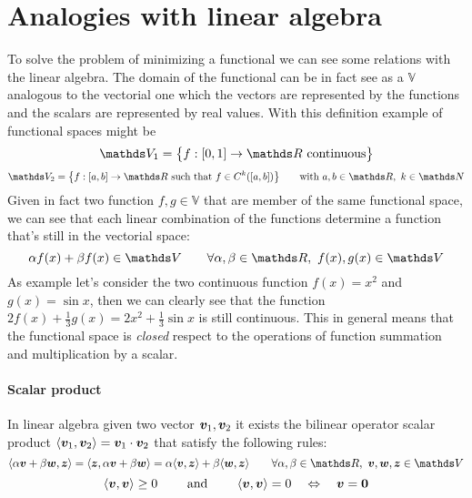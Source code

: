 \section{Analogies with linear algebra}
To solve the problem of minimizing a functional we can see some relations with the linear algebra. The domain of the functional can be in fact see as a  $\mathds V$ analogous to the vectorial one which the vectors are represented by the functions and the scalars are represented by real values. With this definition example of functional spaces might be
\[ \mathds V_1 = \big\{ f : [0,1] \rightarrow \R \textrm{ continuous}\big\} \]
\[ \mathds V_2 = \big\{ f: [a,b]\rightarrow \R \textrm{ such that } f\in C^k([a,b]) \big\} \qquad \textrm{with } a,b \in \R, \ k\in \mathds N \]
Given in fact two function $f,g \in \mathds V$ that are member of the same functional space, we can see that each linear combination of the functions determine a function that's still in the vectorial space:
\[ \alpha f(x) + \beta f(x) \in \mathds V \qquad \forall \alpha,\beta \in \R, \ f(x),g(x) \in \mathds V \]
As example let's consider the two continuous function $f(x) = x^2$ and $g(x) = \sin x$, then we can clearly see that the function $2f(x) + \frac 13 g(x) = 2x^2 +\frac 13\sin x$ is still continuous. This in general means that the functional space is \textit{closed} respect to the operations of function summation and multiplication by a scalar.

\paragraph{Scalar product} In linear algebra given two vector $\boldsymbol{v}_1, \boldsymbol{v}_2$ it exists the bilinear operator scalar product $\langle \boldsymbol{v}_1,\boldsymbol{v}_2 \rangle = \boldsymbol{v}_1 \cdot \boldsymbol{v}_2$  that satisfy the following rules:
\[ \langle \alpha \vett v + \beta \vett w, \vett z\rangle = \langle \vett z , \alpha \vett v + \beta \vett w\rangle = \alpha \langle \vett v,\vett z\rangle + \beta \langle \vett w,\vett z\rangle \qquad \forall \alpha,\beta \in \R, \ \vett v,\vett w,\vett z \in \mathds V \]	
\[ \langle \boldsymbol{v},\boldsymbol{v}\rangle \geq 0 \qquad \textrm{ and } \qquad \langle \boldsymbol{v},\boldsymbol{v} \rangle = 0 \quad \Leftrightarrow \quad \boldsymbol{v} = \boldsymbol{0} \]

